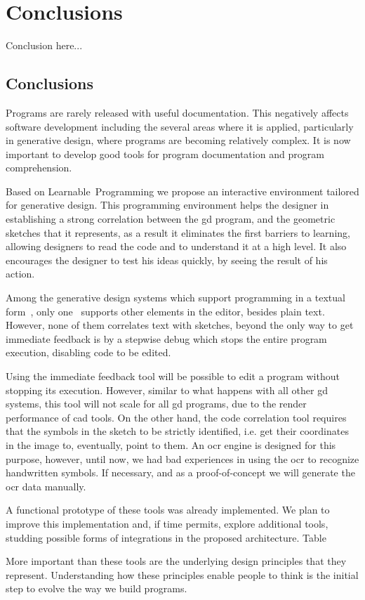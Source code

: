 
\chapter{Conclusions}
\label{chapter:conclusion}
Conclusion here...

\section{Conclusions}
\label{sec:fin}

Programs are rarely released with useful documentation. This negatively affects software development including the several areas where it is applied, particularly in generative design, where programs are becoming relatively complex. It is now important to develop good tools for program documentation and program comprehension.

Based on Learnable~Programming we propose an interactive environment tailored for generative design. This programming environment helps the designer in establishing a strong correlation between the \gls{gd} program, and the geometric sketches that it represents, as a result it eliminates the first barriers to learning, allowing designers to read the code and to understand it at a high level. It also encourages the designer to test his ideas quickly, by seeing the result of his action.

Among the generative design systems which support programming in a textual form~\citep{aish2012designscript,lopes2011portable}, only one~\citep{lopes2011portable} supports other elements in the editor, besides plain text. However, none of them correlates text with sketches, beyond the only way to get immediate feedback is by a stepwise debug which stops the entire program execution, disabling code to be edited.

Using the immediate feedback tool will be possible to edit a program without stopping its execution. However, similar to what happens with all other \gls{gd} systems, this tool will not scale for all \gls{gd} programs, due to the render performance of \gls{cad} tools. On the other hand, the code correlation tool requires that the symbols in the sketch to be strictly identified, i.e. get their coordinates in the image to, eventually, point to them. An \gls{ocr} engine is designed for this purpose, however, until now, we had bad experiences in using the \gls{ocr} to recognize handwritten symbols. If necessary, and as a proof-of-concept we will generate the \gls{ocr} data manually.

A functional prototype of these tools was already implemented. We plan to improve this implementation and, if time permits, explore additional tools, studding possible forms of integrations in the proposed architecture. Table%

More important than these tools are the underlying design principles that they represent. Understanding how these principles enable people to think is the initial step to evolve the way we build programs.